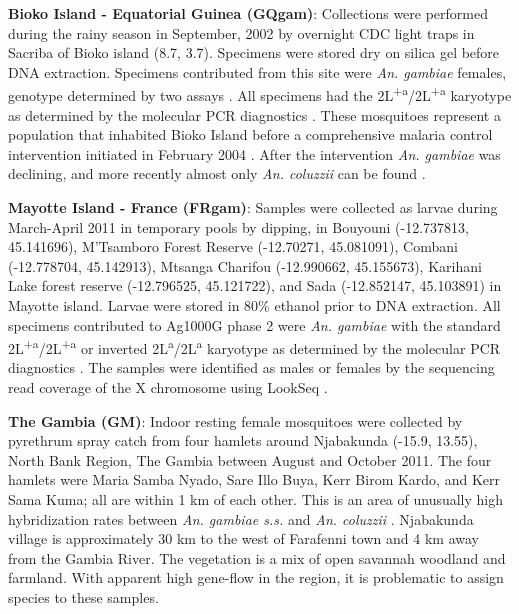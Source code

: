\documentclass[a4paper,11pt,abstracton,hidelinks]{scrartcl}
\begin{document}
\textbf{Bioko Island - Equatorial Guinea (GQgam)}: Collections were performed during the rainy season in September, 2002 by overnight CDC light traps in Sacriba of Bioko island (8.7, 3.7).
%
Specimens were stored dry on silica gel before DNA extraction.
%
Specimens contributed from this site were \textit{An. gambiae} females, genotype determined by two assays \cite{Scott1993, Santolamazza2004}.
%
All specimens had the 2L\textsuperscript{+a}/2L\textsuperscript{+a} karyotype as determined by the molecular PCR diagnostics \cite{White2007}. 
%
These mosquitoes represent a population that inhabited Bioko Island before a comprehensive malaria control intervention initiated in February 2004 \cite{Sharp2007}. 
%
After the intervention \textit{An. gambiae} was declining, and more recently almost only \textit{An. coluzzii} can be found \cite{Overgaard2012}.

%
\textbf{Mayotte Island - France (FRgam)}: Samples were collected as larvae during March-April 2011 in temporary pools by dipping, in Bouyouni (-12.737813, 45.141696), M'Tsamboro Forest Reserve (-12.70271, 45.081091), Combani (-12.778704, 45.142913), Mtsanga Charifou (-12.990662, 45.155673), Karihani Lake forest reserve (-12.796525, 45.121722), and Sada (-12.852147, 45.103891) in Mayotte island.
%
Larvae were stored in 80\% ethanol prior to DNA extraction. 
%
All specimens contributed to Ag1000G phase 2 were \textit{An. gambiae} \cite{Santolamazza2004} with the standard 2L\textsuperscript{+a}/2L\textsuperscript{+a} or inverted 2L\textsuperscript{a}/2L\textsuperscript{a} karyotype as determined by the molecular PCR diagnostics \cite{White2007}.
%
The samples were identified as males or females by the sequencing read coverage of the X chromosome using LookSeq \cite{Manske2009}.

%
\textbf{The Gambia (GM)}: Indoor resting female mosquitoes were collected by pyrethrum spray catch from four hamlets around Njabakunda (-15.9, 13.55), North Bank Region, The Gambia between August and October 2011.
%
The four hamlets were Maria Samba Nyado, Sare Illo Buya, Kerr Birom Kardo, and Kerr Sama Kuma; all are within 1 km of each other.
%
This is an area of unusually high hybridization rates between \textit{An. gambiae s.s.} and \textit{An. coluzzii} \cite{Caputo2008, Nwakanma2013}.
%
Njabakunda village is approximately 30 km to the west of Farafenni town and 4 km away from the Gambia River.
%
The vegetation is a mix of open savannah woodland and farmland.
%
With apparent high gene-flow in the region, it is problematic to assign species to these samples.
\end{document}
